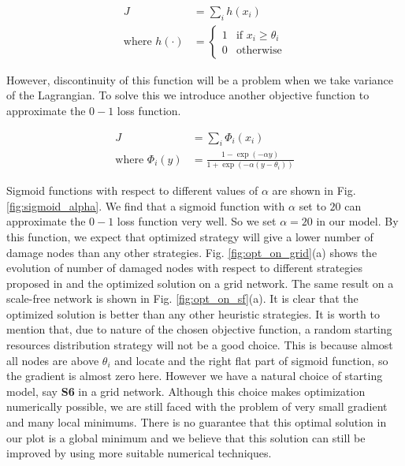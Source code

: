 \begin{equation}
	\label{eq:0_1_loss}
	\begin{aligned}
		J &= \sum_i h(x_i) \\
		\text{where } h(\cdot) &= 
		\begin{cases}
			1 & \text{if } x_i \ge \theta_i \\
			0 & \text{otherwise}
		\end{cases}
	\end{aligned}
\end{equation}

However, discontinuity of this function will be a problem when we take variance of the Lagrangian. To solve this we introduce another objective function to approximate the $0-1$ loss function. 

\begin{equation}
	\label{eq:sigmoid2}
	\begin{aligned}
		J &= \sum_i \Phi_i(x_i) \\
		\text{where } \Phi_i(y) &= \frac{1-\exp(-\alpha y)}{1+\exp(-\alpha (y-\theta_i))}
	\end{aligned}
\end{equation}

Sigmoid functions with respect to different values of $\alpha$ are shown in Fig. \ref{fig:sigmoid_alpha}. We find that a sigmoid function with $\alpha$ set to $20$ can approximate the $0-1$ loss function very well. So we set $\alpha=20$ in our model. By this function, we expect that optimized strategy will give a lower number of damage nodes than any other strategies. Fig. \ref{fig:opt_on_grid}(a) shows the evolution of number of damaged nodes with respect to different strategies proposed in \cite{buzna2007efficient} and the optimized solution on a grid network. The same result on a scale-free network is shown in Fig. \ref{fig:opt_on_sf}(a).  It is clear that the optimized solution is better than any other heuristic strategies. It is worth to mention that, due to nature of the chosen objective function, a random starting resources distribution strategy will not be a good choice. This is because almost all nodes are above $\theta_i$ and locate and the right flat part of sigmoid function, so the gradient is almost zero here.  However we have a natural choice of starting model, say \textbf{S6} in a grid network. Although this choice makes optimization numerically possible, we are still faced with the problem of very small gradient and many local minimums. There is no guarantee that this optimal solution in our plot is a global minimum and we believe that this solution can still be improved by using more suitable numerical  techniques. 

